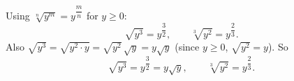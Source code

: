 Using $\sqrt[n]{y^m}=y^{\dfrac {m}{n}}$ for $y\ge0$:
\[
\sqrt{y^3}=y^{\dfrac{3}{2}},\qquad \sqrt[3]{y^2}=y^{\dfrac{2}{3}}.
\]
Also $\sqrt{y^3}=\sqrt{y^2\cdot y}=\sqrt{y^2}\,\sqrt y=y\sqrt y$ (since $y\ge0$, $\sqrt{y^2}=y$). So
\[
\boxed{\sqrt{y^3}=y^{\dfrac{3}{2}}=y\sqrt y,\qquad \sqrt[3]{y^2}=y^{\dfrac{2}{3}}}.
\]
